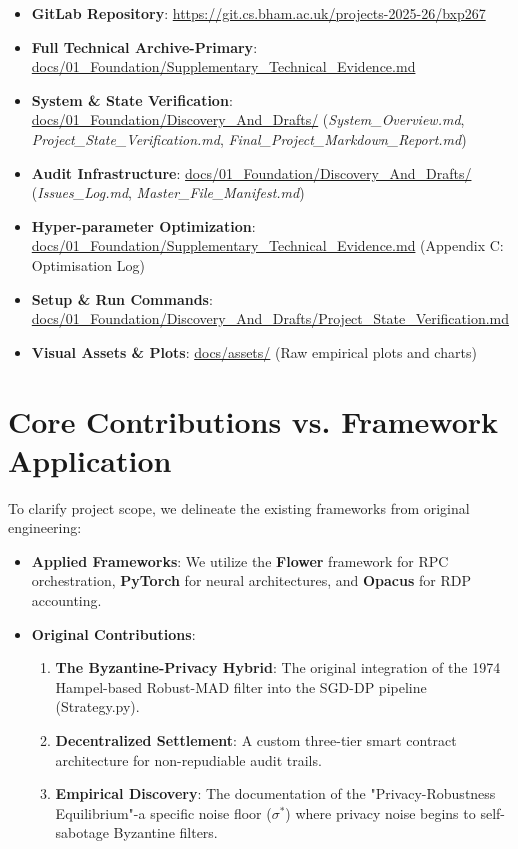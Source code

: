\documentclass[10pt, a4paper, twocolumn]{article}
\begin{document}
\begin{itemize}[leftmargin=*]
    \sloppy
    \item \textbf{GitLab Repository}: \url{https://git.cs.bham.ac.uk/projects-2025-26/bxp267}
    \item \textbf{Full Technical Archive-Primary}: \url{docs/01_Foundation/Supplementary_Technical_Evidence.md}
    \item \textbf{System \& State Verification}: \url{docs/01_Foundation/Discovery_And_Drafts/} (\textit{System\_Overview.md}, \textit{Project\_State\_Verification.md}, \textit{Final\_Project\_Markdown\_Report.md})
    \item \textbf{Audit Infrastructure}: \url{docs/01_Foundation/Discovery_And_Drafts/} (\textit{Issues\_Log.md}, \textit{Master\_File\_Manifest.md})
    \item \textbf{Hyper-parameter Optimization}: \url{docs/01_Foundation/Supplementary_Technical_Evidence.md} (Appendix C: Optimisation Log)
    \item \textbf{Setup \& Run Commands}: \url{docs/01_Foundation/Discovery_And_Drafts/Project_State_Verification.md}
    \item \textbf{Visual Assets \& Plots}: \url{docs/assets/} (Raw empirical plots and charts)
\end{itemize}

\section{Core Contributions vs. Framework Application}
\label{sec:novelty}

To clarify project scope, we delineate the existing frameworks from original engineering:

\begin{itemize}
    \item \textbf{Applied Frameworks}: We utilize the \textbf{Flower} framework for RPC orchestration, \textbf{PyTorch} for neural architectures, and \textbf{Opacus} for RDP accounting.
    \item \textbf{Original Contributions}:
    \begin{enumerate}
        \item \textbf{The Byzantine-Privacy Hybrid}: The original integration of the 1974 Hampel-based Robust-MAD filter into the SGD-DP pipeline (Strategy.py).
        \item \textbf{Decentralized Settlement}: A custom three-tier smart contract architecture for non-repudiable audit trails.
        \item \textbf{Empirical Discovery}: The documentation of the "Privacy-Robustness Equilibrium"-a specific noise floor ($\sigma^*$) where privacy noise begins to self-sabotage Byzantine filters.
    \end{enumerate}
\end{itemize}
\end{document}
